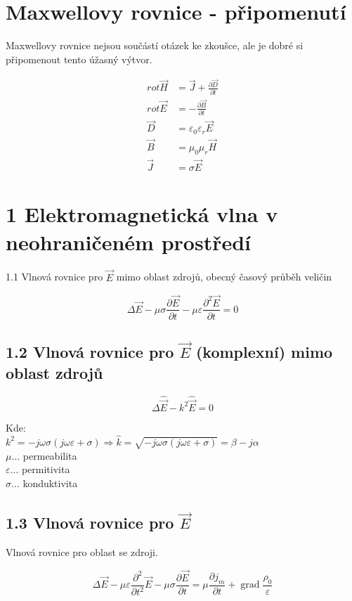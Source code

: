 \documentclass[10pt]{article}
\begin{document}
\section*{Maxwellovy rovnice - připomenutí}
Maxwellovy rovnice nejsou součástí otázek ke zkoušce, ale je dobré si připomenout tento úžasný výtvor.

$$
\begin{aligned}
r o t \vec{H} & =\vec{J}+\frac{\partial \vec{D}}{\partial t} \\
r o t \vec{E} & =-\frac{\partial \vec{B}}{\partial t} \\
\vec{D} & =\varepsilon_{0} \varepsilon_{r} \vec{E} \\
\vec{B} & =\mu_{0} \mu_{r} \vec{H} \\
\vec{J} & =\sigma \vec{E}
\end{aligned}
$$

\section*{1 Elektromagnetická vlna v neohraničeném prostředí}
1.1 Vlnová rovnice pro $\vec{E}$ mimo oblast zdrojů, obecný časový průběh veličin

$$
\Delta \vec{E}-\mu \sigma \frac{\partial \vec{E}}{\partial t}-\mu \varepsilon \frac{\partial^{2} \vec{E}}{\partial t}=0
$$

\subsection*{1.2 Vlnová rovnice pro $\vec{E}$ (komplexní) mimo oblast zdrojů}
$$
\Delta \hat{\vec{E}}-k^{2} \hat{\vec{E}}=0
$$

Kde:\\
$k^{2}=-j \omega \sigma(j \omega \varepsilon+\sigma) \Rightarrow \hat{k}=\sqrt{-j \omega \sigma(j \omega \varepsilon+\sigma)}=\beta-j \alpha$\\
$\mu \ldots$ permeabilita\\
$\varepsilon \ldots$ permitivita\\
$\sigma \ldots$ konduktivita

\subsection*{1.3 Vlnová rovnice pro $\vec{E}$}
Vlnová rovnice pro oblast se zdroji.

$$
\Delta \vec{E}-\mu \varepsilon \frac{\partial^{2}}{\partial t^{2}} \vec{E}-\mu \sigma \frac{\partial \vec{E}}{\partial t}=\mu \frac{\partial j_{m}}{\partial t}+\operatorname{grad} \frac{\rho_{0}}{\varepsilon}
$$
\end{document}

